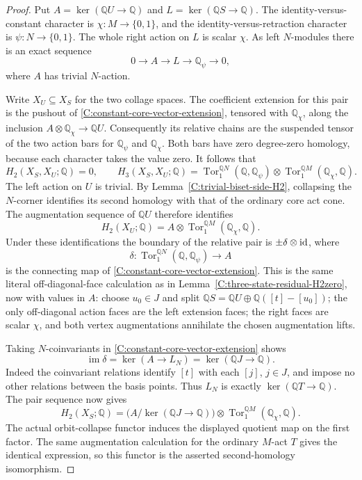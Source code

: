 \begin{proof}
Put $A=\ker(\mathbb QU\to\mathbb Q)$ and
$L=\ker(\mathbb QS\to\mathbb Q)$.
The identity-versus-constant character is
$\chi:M\to\{0,1\}$, and the identity-versus-retraction
character is $\psi:N\to\{0,1\}$.
The whole right action on $L$ is scalar $\chi$.
As left $N$-modules there is an exact sequence
\begin{equation}\label{C:constant-core-vector-extension}
 0\longrightarrow A\longrightarrow L
 \longrightarrow\mathbb Q_\psi\longrightarrow0,
\end{equation}
where $A$ has trivial $N$-action.

Write $X_U\subseteq X_S$ for the two collage spaces.
The coefficient extension for this pair is the pushout of
\eqref{C:constant-core-vector-extension}, tensored with
$\mathbb Q_\chi$, along the inclusion
$A\otimes\mathbb Q_\chi\to\mathbb QU$.
Consequently its relative chains are the suspended tensor of
the two action bars for $\mathbb Q_\psi$ and $\mathbb Q_\chi$.
Both bars have zero degree-zero homology, because each character
takes the value zero.  It follows that
\[
 H_2(X_S,X_U;\mathbb Q)=0,\qquad
 H_3(X_S,X_U;\mathbb Q)=
 \operatorname{Tor}^{\mathbb QN}_1(\mathbb Q,\mathbb Q_\psi)
 \otimes
 \operatorname{Tor}^{\mathbb QM}_1(\mathbb Q_\chi,\mathbb Q).
\]
The left action on $U$ is trivial.  By
Lemma~\ref{C:trivial-biset-side-H2}, collapsing the $N$-corner
identifies its second homology with that of the ordinary core
act cone.  The augmentation sequence of $\mathbb QU$ therefore
identifies
\[
 H_2(X_U;\mathbb Q)=
 A\otimes
 \operatorname{Tor}^{\mathbb QM}_1(\mathbb Q_\chi,\mathbb Q).
\]
Under these identifications the boundary of the relative pair
is $\pm\delta\otimes\mathrm {id}$, where
\[
 \delta:
 \operatorname{Tor}^{\mathbb QN}_1(\mathbb Q,\mathbb Q_\psi)
 \longrightarrow A
\]
is the connecting map of
\eqref{C:constant-core-vector-extension}.
This is the same literal off-diagonal-face calculation as in
Lemma~\ref{C:three-state-residual-H2zero}, now with values in
$A$: choose $u_0\in J$ and split
$\mathbb QS=\mathbb QU\oplus\mathbb Q([t]-[u_0])$;
the only off-diagonal action faces are the left extension faces;
the right faces are scalar $\chi$, and both vertex augmentations
annihilate the chosen augmentation lifts.

Taking $N$-coinvariants in
\eqref{C:constant-core-vector-extension} shows
\[
 \operatorname{im}\delta
  =\ker(A\longrightarrow L_N)
  =\ker(\mathbb QJ\longrightarrow\mathbb Q).
\]
Indeed the coinvariant relations identify $[t]$ with each $[j]$,
$j\in J$, and impose no other relations between the basis points.
Thus $L_N$ is exactly $\ker(\mathbb QT\to\mathbb Q)$.
The pair sequence now gives
\[
 H_2(X_S;\mathbb Q)=
 \bigl(A/\ker(\mathbb QJ\to\mathbb Q)\bigr)
 \otimes
 \operatorname{Tor}^{\mathbb QM}_1(\mathbb Q_\chi,\mathbb Q).
\]
The actual orbit-collapse functor induces the displayed quotient
map on the first factor.  The same augmentation calculation for
the ordinary $M$-act $T$ gives the identical expression, so this
functor is the asserted second-homology isomorphism.
\end{proof}

